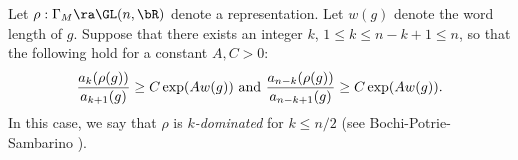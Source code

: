 
Let $\rho: \Gamma_M \ra \GL(n, \bR)$ denote a representation. 
%
%
% 
%
%
%
%
%
%
%
%
%
%
Let $w(g)$ denote the word length of $g$. 
Suppose that there exists an integer $k$,
$1 \leq k \leq n-k+1 \leq n$, 
so that the following hold for a constant $A, C > 0$: 
\begin{equation*}
 \frac{a_k(\rho(g))}{a_{k+1}(g)} \geq C\exp(A w(g)) \hbox{ and }
  \frac{a_{n-k}(\rho(g))}{a_{n-k+1}(g)} \geq C\exp(A w(g)).
\end{equation*} 
In this case, we say that $\rho$ is {\em $k$-dominated}
for $k \leq n/2$ 
(see Bochi-Potrie-Sambarino \cite{BPS}).


